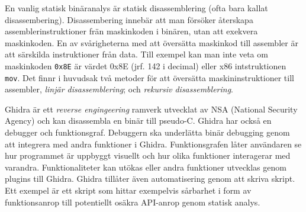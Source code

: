 En vanlig statisk binäranalys är statisk disassemblering (ofta bara kallat
disassembering)\cite{andriesse2018}. Disassembering innebär att man försöker
återskapa assemblerinstruktioner frän maskinkoden i binären, utan att exekvera
maskinkoden\cite{andriesse2018}. En av svårigheterna med att översätta maskinkod
till assembler är att särskilda instruktioner från data\cite{andriesse2018}.
Till exempel kan man inte veta om maskinkoden \verb|0x8E| är värdet 0x8E (jrf.
142 i decimal) eller x86 intstruktionen \verb|mov|\cite{andriesse2018}. Det
finnr i huvudsak två metoder för att översätta maskininstruktioner
till assembler, \emph{linjär disassemblering}; och \emph{rekursiv
disassemblering}\cite{andriesse2018}.

Ghidra är ett \emph{reverse engingeering} ramverk utvecklat av NSA
(National Security Agency) och kan disassembla en binär till pseudo-C.
Ghidra har också en debugger och funktionsgraf. Debuggern ska underlätta binär
debugging genom att integrera med andra funktioner i Ghidra. Funktionsgrafen
låter användaren se hur programmet är uppbyggt visuellt och hur olika
funktioner interagerar med varandra. Funktionaliteter kan utökas eller andra
funktioner utvecklas genom plugins till Ghidra\cite{ghidra_use_cases}. Ghidra
tillåter även automatisering genom att skriva skript. Ett exempel är ett skript
som hittar exempelvis sårbarhet i form av funktionsanrop till potentiellt
osäkra API-anrop genom statisk analys\cite{ghidra_script}.
